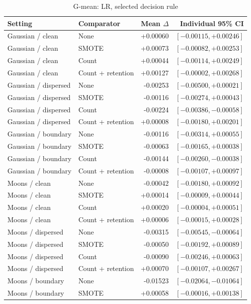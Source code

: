 \begin{table}[htbp]
\caption{G-mean: LR, selected decision rule}
\centering\small
\begin{tabular}{llrr}
\hline
Setting & Comparator & Mean $\Delta$ & Individual 95\% CI\\
\hline
Gaussian / clean & None & +0.00060 & $[-0.00115, +0.00246]$ \\
Gaussian / clean & SMOTE & +0.00073 & $[-0.00082, +0.00253]$ \\
Gaussian / clean & Count & +0.00044 & $[-0.00114, +0.00249]$ \\
Gaussian / clean & Count + retention & +0.00127 & $[-0.00002, +0.00268]$ \\
Gaussian / dispersed & None & -0.00253 & $[-0.00500, +0.00021]$ \\
Gaussian / dispersed & SMOTE & -0.00116 & $[-0.00274, +0.00043]$ \\
Gaussian / dispersed & Count & -0.00224 & $[-0.00386, -0.00058]$ \\
Gaussian / dispersed & Count + retention & +0.00008 & $[-0.00180, +0.00201]$ \\
Gaussian / boundary & None & -0.00116 & $[-0.00314, +0.00055]$ \\
Gaussian / boundary & SMOTE & -0.00063 & $[-0.00165, +0.00038]$ \\
Gaussian / boundary & Count & -0.00144 & $[-0.00260, -0.00038]$ \\
Gaussian / boundary & Count + retention & -0.00008 & $[-0.00107, +0.00097]$ \\
Moons / clean & None & -0.00042 & $[-0.00180, +0.00092]$ \\
Moons / clean & SMOTE & +0.00014 & $[-0.00009, +0.00044]$ \\
Moons / clean & Count & +0.00020 & $[-0.00004, +0.00051]$ \\
Moons / clean & Count + retention & +0.00006 & $[-0.00015, +0.00028]$ \\
Moons / dispersed & None & -0.00315 & $[-0.00545, -0.00064]$ \\
Moons / dispersed & SMOTE & -0.00050 & $[-0.00192, +0.00089]$ \\
Moons / dispersed & Count & -0.00090 & $[-0.00246, +0.00063]$ \\
Moons / dispersed & Count + retention & +0.00070 & $[-0.00107, +0.00267]$ \\
Moons / boundary & None & -0.01523 & $[-0.02064, -0.01064]$ \\
Moons / boundary & SMOTE & +0.00058 & $[-0.00016, +0.00138]$ \\

\end{tabular}
\end{table}
